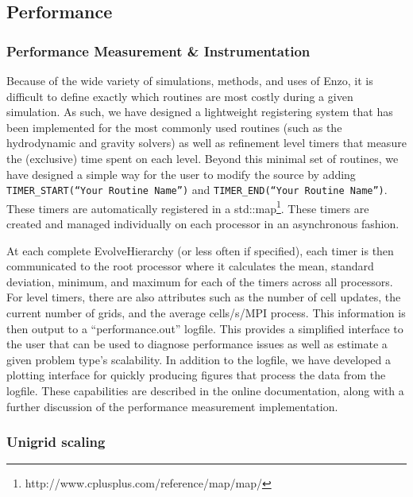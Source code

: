 
\subsection{Performance}
\label{sec.performance}

\subsubsection{Performance Measurement \& Instrumentation}

Because of the wide variety of simulations, methods, and uses of Enzo,
it is difficult to define exactly which routines are most costly
during a given simulation.  As such, we have designed a lightweight
registering system that has been implemented for the most commonly
used routines (such as the hydrodynamic and gravity solvers) as well
as refinement level timers that measure the (exclusive) time spent on
each level.  Beyond this minimal set of routines, we have designed a
simple way for the user to modify the source by adding
\texttt{TIMER\_START(``Your Routine Name'')} and
\texttt{TIMER\_END(``Your Routine Name'')}.  These timers are
automatically registered in a
std::map\footnote{http://www.cplusplus.com/reference/map/map/}.  These
timers are created and managed individually on each processor in an
asynchronous fashion.

At each complete EvolveHierarchy (or less often if specified), each timer is
then communicated to the root processor where it calculates the mean, standard
deviation, minimum, and maximum for each of the timers across all processors. 
For level timers, there are also attributes such as the number of cell updates,
the current number of grids, and the average cells/s/MPI process.  This
information is then output to a ``performance.out'' logfile.  This provides a 
simplified interface to the user that can be used to diagnose performance 
issues as well as estimate a given problem type's scalability.  In addition to 
the logfile, we have developed a plotting interface for quickly producing 
figures that process the data from the logfile.  These capabilities are 
described in the online documentation, along with a further discussion of the 
performance measurement implementation.

\subsubsection{Unigrid scaling}
\label{sec:weak_scaling}

